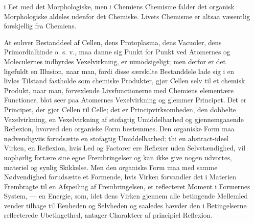 \documentclass[12pt,a4paper]{book}
\begin{document}
i Eet med det Morphologiske, men i Chemiens Chemisme falder det organisk
Morphologiske aldeles udenfor det Chemiske. Livets Chemisme er altsaa
væsentlig forskjellig fra Chemiens.

At enhver Bestanddeel af Cellen, dens Protoplasma, dens Vacuoler, dens
Primordialhinde o. s. v., maa danne sig Punkt for Punkt ved Atomernes og
Moleculernes indbyrdes Vexelvirkning, er uimodsigeligt; men derfor er det
ligefuldt en Illusion, naar man, fordi disse særskilte Bestanddele lade
sig i en livløs Tilstand fastholde som chemiske Produkter, gjør Cellen
selv til et chemisk Produkt, naar man, forvexlende Livsfunctionerne med
Chemiens elementære Functioner, blot seer paa Atomernes Vexelvirkning og
glemmer Principet. Det er Principet, der gjør Cellen til Celle; det er
Principvirksomheden, den dobbelte Vexelvirkning, en Vexelvirkning af
stofagtig Umiddelbarhed og gjennemgaaende Reflexion, hvorved den
organiske Form bestemmes. Den organiske Form maa nødvendigviis
forudsætte en stofagtig Umiddelbarhed; thi en abstract-ideel Virken, en
Reflexion, hvis Led og Factorer ere Reflexer uden Selvstændighed, vil
uophørlig fortære sine egne Frembringelser og kan ikke give nogen
udvortes, materiel
og synlig Skikkelse. Men den organiske Form maa med samme Nødvendighed
forudsætte et Formende, hvis Virken forvandler det i Materien Frembragte
til en Afspeiling af Frembringelsen, et reflecteret Moment i Formernes
System, --- en Energie, som, idet dens Virken gjennem alle betingende
Mellemled vender tilbage til Eenheden og Selvheden og saaledes hævder den
i Betingelserne reflecterede Ubetingethed, antager Charakteer af
principiel Reflexion.
\end{document}
